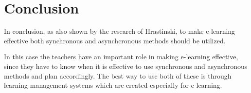 \documentclass[10pt,twoside,english,a4paper]{article}
\begin{document}
\section{Conclusion} \label{conc} 
In conclusion, as also shown by the research of Hrastinski, to make e-learning effective both synchronous and asynchcronous methods should be utilized.

In this case the teachers have an important role in making e-learning effective, since they have to know when it is effective to use synchronous and asynchronous methods and plan accordingly.
The best way to use both of these is through learning management systems which are created especially for e-learning.



 
\end{document}
